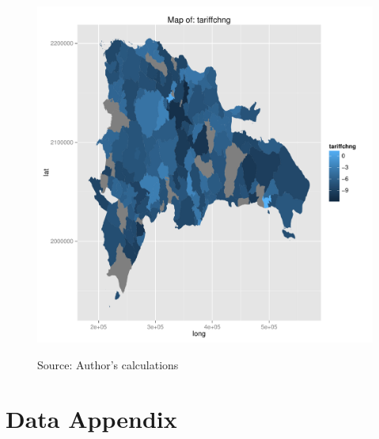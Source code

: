 \documentclass[12pt]{article}
\begin{document}
\begin{figure}[H]
\begin{center}
\includegraphics[scale=.75,keepaspectratio=true]{../Maps/drtariffchng.pdf}
\caption{\label{fig:Map3}}
Source: Author's calculations
\end{center}
\end{figure}


\newpage
\section{Data Appendix}
\label{sec:Appendix}
\end{document}
